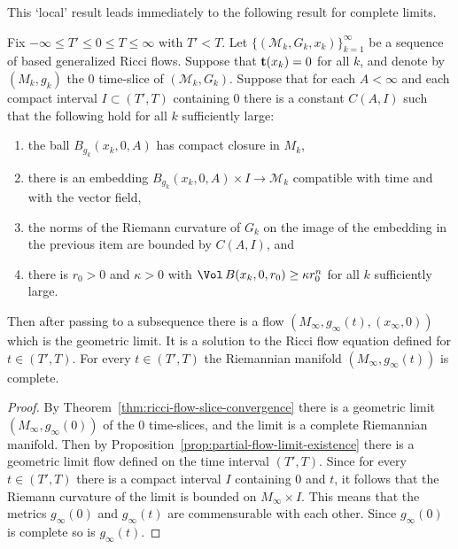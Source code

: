 This `local' result leads immediately to the following result for
complete limits.

\begin{theorem}\label{thm:ricci-flow-geometric-limit-existence}
\label{flowlimit}

Fix $-\infty\le T'\le 0\le T\le \infty$ with $T'<T$. Let $\{({\mathcal
M}_k,G_k,x_k)\}_{k=1}^\infty$ be a sequence of based generalized Ricci flows.
Suppose that ${\bf t}(x_k)=0$ for all $k$, and denote by $(M_k,g_k)$ the $0$
time-slice of $({\mathcal M}_k,G_k)$. Suppose that for each $A<\infty$ and each
compact interval $I\subset (T',T)$ containing $0$ there is a constant $C(A,I)$
such that the following hold for all $k$ sufficiently large:
\begin{enumerate}
\item[(1)]  the ball
$B_{g_k}(x_k,0,A)$ has compact closure in $M_k$, \item[(2)]  there is an
embedding $B_{g_k}(x_k,0,A)\times I\to {\mathcal M}_k$ compatible with time and
with the vector field,
\item[(3)] the norms of the Riemann curvature of $G_k$ on the image of the embedding in the
previous item are  bounded by $C(A,I)$, and
\item[(4)] there is $r_0>0$ and $\kappa>0$ with $\Vol\,B(x_k,0,r_0)\ge \kappa r_0^n$
for all $k$ sufficiently large.
\end{enumerate}
 Then after passing to a subsequence there is a
flow  $(M_\infty,g_\infty(t),(x_\infty,0))$ which is the geometric
limit. It is a solution to the Ricci flow equation defined for $t\in
(T',T)$. For every $t\in (T',T)$ the Riemannian manifold
$(M_\infty,g_\infty(t))$ is complete.
\end{theorem}


\begin{proof}
\sketch
{}
By Theorem~\ref{thm:ricci-flow-slice-convergence} there is a geometric limit $(M_\infty,g_\infty(0))$
of the $0$ time-slices, and the limit  is a complete Riemannian manifold. Then
by Proposition~\ref{prop:partial-flow-limit-existence} there is a geometric limit flow defined
on the time interval $(T',T)$. Since for every $t\in (T',T)$ there is a compact
interval $I$ containing $0$ and $t$, it follows that the Riemann curvature of
the limit is bounded on $M_\infty\times I$. This means that the metrics
$g_\infty(0)$ and $g_\infty(t)$ are commensurable with each other. Since
$g_\infty(0)$ is complete so is $g_\infty(t)$.
\end{proof}


